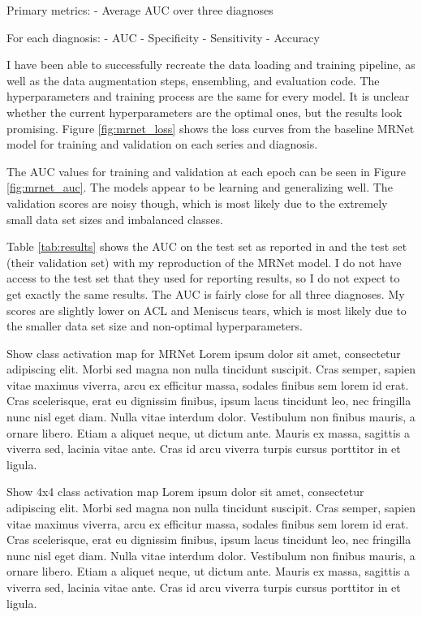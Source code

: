 \documentclass[10pt,twocolumn,letterpaper]{article}
\begin{document}
Primary metrics:
- Average AUC over three diagnoses

For each diagnosis:
- AUC
- Specificity
- Sensitivity
- Accuracy

I have been able to successfully recreate the data loading and training pipeline, as well as the data augmentation steps, ensembling, and evaluation code. The hyperparameters and training process are the same for every model. It is unclear whether the current hyperparameters are the optimal ones, but the results look promising. Figure \ref{fig:mrnet_loss} shows the loss curves from the baseline MRNet model for training and validation on each series and diagnosis.

The AUC values for training and validation at each epoch can be seen in Figure \ref{fig:mrnet_auc}. The models appear to be learning and generalizing well. The validation scores are noisy though, which is most likely due to the extremely small data set sizes and imbalanced classes.

Table \ref{tab:results} shows the AUC on the test set as reported in \cite{bien2018deep} and the test set (their validation set) with my reproduction of the MRNet model. I do not have access to the test set that they used for reporting results, so I do not expect to get exactly the same results. The AUC is fairly close for all three diagnoses. My scores are slightly lower on ACL and Meniscus tears, which is most likely due to the smaller data set size and non-optimal hyperparameters.

Show class activation map for MRNet
Lorem ipsum dolor sit amet, consectetur adipiscing elit. Morbi sed magna non nulla tincidunt suscipit. Cras semper, sapien vitae maximus viverra, arcu ex efficitur massa, sodales finibus sem lorem id erat. Cras scelerisque, erat eu dignissim finibus, ipsum lacus tincidunt leo, nec fringilla nunc nisl eget diam. Nulla vitae interdum dolor. Vestibulum non finibus mauris, a ornare libero. Etiam a aliquet neque, ut dictum ante. Mauris ex massa, sagittis a viverra sed, lacinia vitae ante. Cras id arcu viverra turpis cursus porttitor in et ligula.

Show 4x4 class activation map
Lorem ipsum dolor sit amet, consectetur adipiscing elit. Morbi sed magna non nulla tincidunt suscipit. Cras semper, sapien vitae maximus viverra, arcu ex efficitur massa, sodales finibus sem lorem id erat. Cras scelerisque, erat eu dignissim finibus, ipsum lacus tincidunt leo, nec fringilla nunc nisl eget diam. Nulla vitae interdum dolor. Vestibulum non finibus mauris, a ornare libero. Etiam a aliquet neque, ut dictum ante. Mauris ex massa, sagittis a viverra sed, lacinia vitae ante. Cras id arcu viverra turpis cursus porttitor in et ligula.
\end{document}
